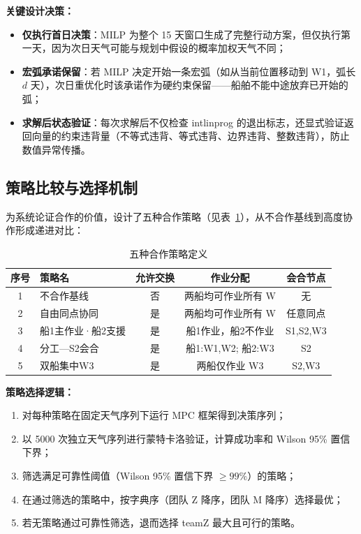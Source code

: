 \textbf{关键设计决策：}
\begin{itemize}
    \item \textbf{仅执行首日决策}：MILP 为整个 15 天窗口生成了完整行动方案，但仅执行第一天，因为次日天气可能与规划中假设的概率加权天气不同；
    \item \textbf{宏弧承诺保留}：若 MILP 决定开始一条宏弧（如从当前位置移动到 W1，弧长 $d$ 天），次日重优化时该承诺作为硬约束保留——船舶不能中途放弃已开始的弧；
    \item \textbf{求解后状态验证}：每次求解后不仅检查 intlinprog 的退出标志，还显式验证返回向量的约束违背量（不等式违背、等式违背、边界违背、整数违背），防止数值异常传播。
\end{itemize}

\subsection{策略比较与选择机制}

为系统论证合作的价值，设计了五种合作策略（见表~\ref{tab:strategies}），从不合作基线到高度协作形成递进对比：

\begin{table}[htbp]
\centering
\caption{五种合作策略定义}
\label{tab:strategies}
\begin{tabular}{c|l|c|c|c}
\toprule
序号 & 策略名 & 允许交换 & 作业分配 & 会合节点 \\
\midrule
1 & 不合作基线 & 否 & 两船均可作业所有 W & 无 \\
2 & 自由同点协同 & 是 & 两船均可作业所有 W & 任意同点 \\
3 & 船1主作业·船2支援 & 是 & 船1作业，船2不作业 & S1,S2,W3 \\
4 & 分工—S2会合 & 是 & 船1:W1,W2; 船2:W3 & S2 \\
5 & 双船集中W3 & 是 & 两船仅作业 W3 & S2,W3 \\
\bottomrule
\end{tabular}
\end{table}

\textbf{策略选择逻辑：}
\begin{enumerate}
    \item 对每种策略在固定天气序列下运行 MPC 框架得到决策序列；
    \item 以 5000 次独立天气序列进行蒙特卡洛验证，计算成功率和 Wilson 95\% 置信下界；
    \item 筛选满足可靠性阈值（Wilson 95\% 置信下界 $\geq 99\%$）的策略；
    \item 在通过筛选的策略中，按字典序（团队 Z 降序，团队 M 降序）选择最优；
    \item 若无策略通过可靠性筛选，退而选择 teamZ 最大且可行的策略。
\end{enumerate}

